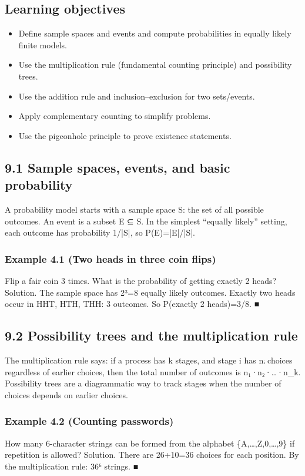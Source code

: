 \documentclass[11pt]{article}
\begin{document}
\subsection*{Learning objectives}
\begin{itemize}[leftmargin=*,itemsep=0.25em]
\item Define sample spaces and events and compute probabilities in equally likely finite models.
\item Use the multiplication rule (fundamental counting principle) and possibility trees.
\item Use the addition rule and inclusion–exclusion for two sets/events.
\item Apply complementary counting to simplify problems.
\item Use the pigeonhole principle to prove existence statements.
\end{itemize}
\subsection{9.1 Sample spaces, events, and basic probability}
A probability model starts with a sample space S: the set of all possible outcomes. An
event is a subset E ⊆ S. In the simplest “equally likely” setting, each outcome has
probability 1/|S|, so P(E)=|E|/|S|.
\subsubsection*{Example 4.1 (Two heads in three coin flips)}
Flip a fair coin 3 times. What is the probability of getting exactly 2 heads?
Solution. The sample space has 2³=8 equally likely outcomes.
Exactly two heads occur in HHT, HTH, THH: 3 outcomes.
So P(exactly 2 heads)=3/8. ■
\subsection{9.2 Possibility trees and the multiplication rule}
The multiplication rule says: if a process has k stages, and stage i has nᵢ choices
regardless of earlier choices, then the total number of outcomes is n₁·n₂·…·n\_k. Possibility
trees are a diagrammatic way to track stages when the number of choices depends on
earlier choices.
\subsubsection*{Example 4.2 (Counting passwords)}
How many 6-character strings can be formed from the alphabet \{A,…,Z,0,…,9\} if
repetition is allowed?
Solution. There are 26+10=36 choices for each position. By the multiplication rule:
36⁶ strings. ■
\end{document}
